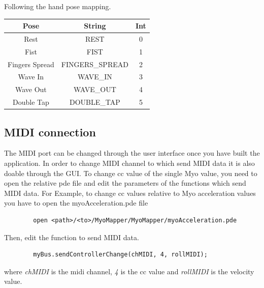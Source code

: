 \documentclass[12pt,a4paper]{article}
\begin{document}
	Following the hand pose mapping.
	
	\begin{tabular}{|c|c|c|}\hline
		\textbf{Pose}  & \textbf{String} & \textbf{Int} \\ \hline
		Rest           & REST            & 0 \\ \hline
		Fist           & FIST            & 1 \\ \hline
		Fingers Spread & FINGERS\_SPREAD  & 2 \\ \hline
		Wave In        & WAVE\_IN         & 3 \\ \hline
		Wave Out       & WAVE\_OUT        & 4 \\ \hline
		Double Tap     & DOUBLE\_TAP      & 5 \\ \hline
	\end{tabular}  
	
	\subsection{MIDI connection}
	
	The MIDI port can be changed through the user interface once you have built the application. In order to change MIDI channel to which send MIDI data it is also doable through the GUI. To change cc value of the single Myo value, you need to open the relative pde file and edit the parameters of the functions which send MIDI data. For Example, to change cc values relative to Myo acceleration values you have to open the myoAcceleration.pde file
	\begin{verbatim}
		open <path>/<to>/MyoMapper/MyoMapper/myoAcceleration.pde
	\end{verbatim}	

	Then, edit the function to send MIDI data.
	\begin{verbatim}
		myBus.sendControllerChange(chMIDI, 4, rollMIDI);
	\end{verbatim}
	
	where \textit{chMIDI} is the midi channel, \textit{4} is the cc value and \textit{rollMIDI} is the velocity value.
	
\end{document}
